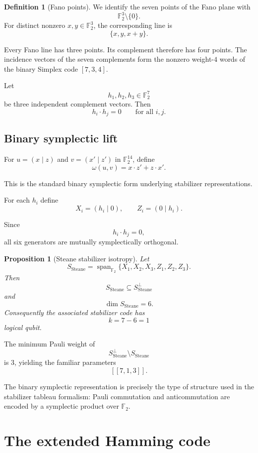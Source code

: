 \documentclass[11pt,a4paper]{article}
\newtheorem{proposition}[theorem]{Proposition}
\theoremstyle{definition}
\newtheorem{definition}[theorem]{Definition}
\theoremstyle{remark}
\newcommand{\F}{\mathbb F}
\newcommand{\Span}{\operatorname{span}}
\begin{document}
\begin{definition}[Fano points]
We identify the seven points of the Fano plane with
\[
\F_2^3\setminus\{0\}.
\]
For distinct nonzero $x,y\in\F_2^3$, the corresponding line is
\[
\{x,y,x+y\}.
\]
\end{definition}

Every Fano line has three points.  Its complement therefore has four points.
The incidence vectors of the seven complements form the nonzero weight-$4$
words of the binary Simplex code $[7,3,4]$.

Let
\[
h_1,h_2,h_3\in\F_2^7
\]
be three independent complement vectors.  Then
\[
h_i\cdot h_j=0
\qquad
\text{for all }i,j.
\]

\subsection{Binary symplectic lift}

For $u=(x\mid z)$ and $v=(x'\mid z')$ in $\F_2^{14}$, define
\[
\omega(u,v)
=
x\cdot z'+z\cdot x'.
\]

This is the standard binary symplectic form underlying stabilizer
representations.

For each $h_i$ define
\[
X_i=(h_i\mid0),
\qquad
Z_i=(0\mid h_i).
\]

Since
\[
h_i\cdot h_j=0,
\]
all six generators are mutually symplectically orthogonal.

\begin{proposition}[Steane stabilizer isotropy]
Let
\[
S_{\mathrm{Steane}}
=
\Span_{\F_2}
\{X_1,X_2,X_3,Z_1,Z_2,Z_3\}.
\]
Then
\[
S_{\mathrm{Steane}}
\subseteq
S_{\mathrm{Steane}}^\perp
\]
and
\[
\dim S_{\mathrm{Steane}}=6.
\]
Consequently the associated stabilizer code has
\[
k=7-6=1
\]
logical qubit.
\end{proposition}

The minimum Pauli weight of
\[
S_{\mathrm{Steane}}^\perp
\setminus
S_{\mathrm{Steane}}
\]
is $3$, yielding the familiar parameters
\[
[[7,1,3]].
\]

The binary symplectic representation is precisely the type of structure used
in the stabilizer tableau formalism: Pauli commutation and anticommutation
are encoded by a symplectic product over $\F_2$.

\section{The extended Hamming code}
\end{document}
